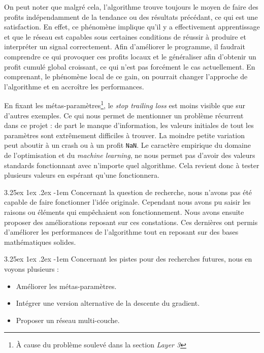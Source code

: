 \documentclass[a4paper, 11pt]{article}
\makeatletter
\renewcommand\paragraph{\@startsection{paragraph}{5}{\z@}%
  {3.25ex \@plus1ex \@minus.2ex}%
  {-1em}%
  {\normalfont\normalsize\bfseries}}
\makeatother
\begin{document}
On peut noter que malgré cela, l'algorithme trouve toujours le moyen de faire des profits indépendamment de la tendance ou des résultats précédant, ce
qui est une satisfaction. En effet, ce phénomène implique qu'il y a effectivement apprentissage et que le réseau est capables sous certaines conditions
de réussir à produire et interpréter un signal correctement. Afin
d'améliorer le programme, il faudrait comprendre ce qui provoquer ces profits locaux et le généraliser afin d'obtenir un profit cumulé global croissant, ce qui
n'est pas forcément le cas actuellement. En comprenant, le phénomène local de ce gain, on pourrait changer l'approche de l'algorithme et en accroître les
performances.

En fixant les métas-paramètres\footnote{À cause du problème soulevé dans la section \textit{Layer 3}}, le \textit{stop trailing loss} est moins visible
que sur d'autres exemples. Ce qui nous permet de mentionner un problème récurrent dans ce projet : de part le manque d'information, les valeurs initiales
de tout les paramètres sont extrêmement difficiles à trouver. La moindre petite variation peut aboutir à un crash ou à un profit \texttt{NaN}. Le caractère
empirique du domaine de l'optimisation et du \textit{machine learning}, ne nous permet pas d'avoir des valeurs standards fonctionnant avec n'importe quel
algorithme. Cela revient donc à tester plusieurs valeurs en espérant qu'une fonctionnera.

\paragraph{}
Concernant la question de recherche, nous n'avons pas été capable de faire fonctionner l'idée originale. Cependant nous avons pu saisir les raisons ou 
éléments qui empêchaient son fonctionnement. Nous avons ensuite proposer des améliorations reposant sur ces constations. Ces dernières ont permis 
d'améliorer les performances de l'algorithme tout en reposant sur des bases mathématiques solides.

\paragraph{}
Concernant les pistes pour des recherches futures, nous en voyons plusieurs :
\begin{itemize}
 \item Améliorer les métas-paramètres.
 \item Intégrer une version alternative de la descente du gradient.
 \item Proposer un réseau multi-couche.
\end{itemize}
\end{document}
